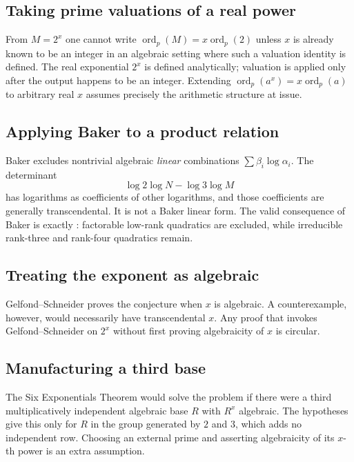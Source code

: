 \documentclass[11pt]{article}
\theoremstyle{definition}
\theoremstyle{remark}
\newcommand{\ord}{\operatorname{ord}}
\begin{document}
\subsection{Taking prime valuations of a real power}

From $M=2^x$ one cannot write
$\ord_p(M)=x\ord_p(2)$ unless $x$ is already known to be an integer in an algebraic setting
where such a valuation identity is defined.  The real exponential $2^x$ is defined
analytically; valuation is applied only after the output happens to be an integer.  Extending
$\ord_p(a^x)=x\ord_p(a)$ to arbitrary real $x$ assumes precisely the arithmetic structure at
issue.

\subsection{Applying Baker to a product relation}

Baker excludes nontrivial algebraic \emph{linear} combinations
$\sum\beta_i\log\alpha_i$.  The determinant
\[
 \log2\log N-\log3\log M
\]
has logarithms as coefficients of other logarithms, and those coefficients are generally
transcendental.  It is not a Baker linear form.  The valid consequence of Baker is exactly
: factorable low-rank quadratics are excluded, while irreducible
rank-three and rank-four quadratics remain.

\subsection{Treating the exponent as algebraic}

Gelfond--Schneider proves the conjecture when $x$ is algebraic.  A counterexample, however,
would necessarily have transcendental $x$.  Any proof that invokes Gelfond--Schneider on
$2^x$ without first proving algebraicity of $x$ is circular.

\subsection{Manufacturing a third base}

The Six Exponentials Theorem would solve the problem if there were a third
multiplicatively independent algebraic base $R$ with $R^x$ algebraic.  The hypotheses give
this only for $R$ in the group generated by $2$ and $3$, which adds no independent row.
Choosing an external prime and asserting algebraicity of its $x$-th power is an extra
assumption.
\end{document}
